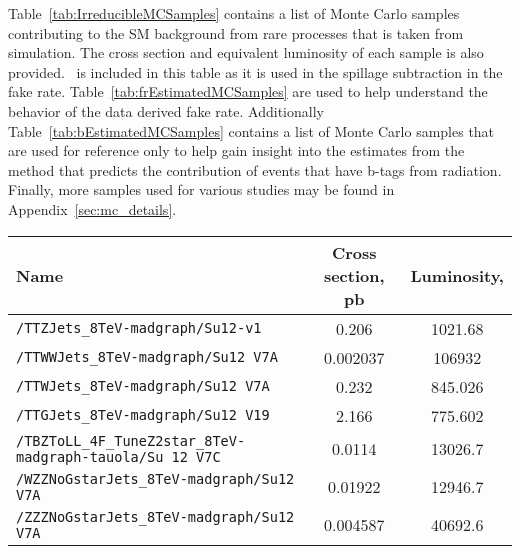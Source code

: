 Table~\ref{tab:IrreducibleMCSamples} contains a list of Monte Carlo samples contributing to the SM background from rare processes that is taken from simulation.  The cross section and equivalent luminosity of each sample is also provided. \ttZ \ is included in this table as it is used in the spillage subtraction in the fake rate. Table~\ref{tab:frEstimatedMCSamples} are used to help understand the behavior of the data derived fake rate. Additionally Table~\ref{tab:bEstimatedMCSamples} contains a list of Monte Carlo samples that are used for reference only to help gain insight into  the estimates from the method that predicts the contribution of events that have b-tags from radiation. Finally, more samples used for various studies may be found in Appendix~\ref{sec:mc_details}.\\

\begin{sidewaystable}[H]
\caption{\label{tab:IrreducibleMCSamples} MC datasets corresponding to contributions not covered by the data-driven methods.
Predicted yields from the SM samples listed here are used directly in the analysis. 
The common part of each dataset name Summer12\_DR53X-PU\_S10\_START53\_V7X-v1 is replaced with a shorthand Su12 V7X. 
All datasets are in the AODSIM data tier.}
\begin{center}
\begin{tabular}{lcc}
\hline\hline
Name														           & Cross section, pb & Luminosity, \fbinv \\ \hline
\verb=/TTZJets_8TeV-madgraph/Su12-v1=                                                                 & 0.206                     &       1021.68         \\ 
\verb=/TTWWJets_8TeV-madgraph/Su12 V7A=                                                            & 0.002037          &      106932       \\ 
\verb=/TTWJets_8TeV-madgraph/Su12 V7A=                                                               & 0.232             &        845.026         \\ 
\verb=/TTGJets_8TeV-madgraph/Su12 V19=                                                                & 2.166             &       775.602          \\ 
\verb=/TBZToLL_4F_TuneZ2star_8TeV-madgraph-tauola/Su 12 V7C=                 &  0.0114             &         13026.7        \\
\verb=/WZZNoGstarJets_8TeV-madgraph/Su12 V7A=                                               & 0.01922           &       12946.7        \\ 
\verb=/ZZZNoGstarJets_8TeV-madgraph/Su12 V7A=                                                 & 0.004587          &     40692.6          \\ 
\hline\hline
\end{tabular}

\end{center}
\end{sidewaystable}



